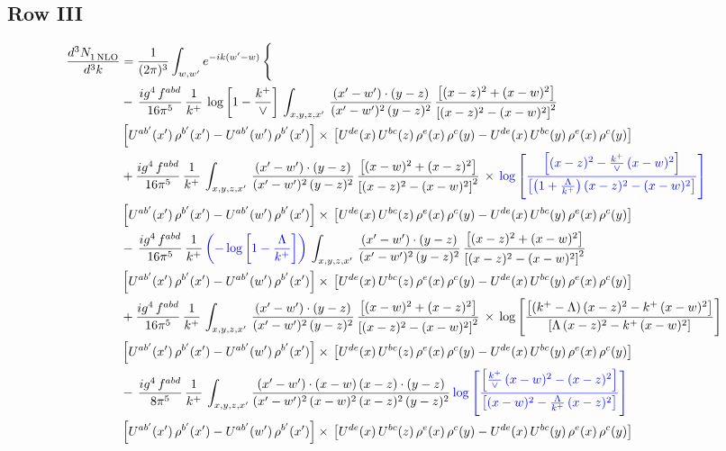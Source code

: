 \documentclass[9pt]{article}
\newcommand{\new}[1]{{\color{blue}#1}}
\numberwithin{equation}{section}
\begin{document}
\subsection{Row III}
\begin{align}
   \frac{d^{3}N_{1\,\rm NLO}^{\rm}}{d^{3}k}  & = \frac{1}{(2\pi)^{3}}  \int_{w, w^\prime} e^{-ik(w^\prime-w)}\, \Bigg\{\notag \\ & -\,\frac{ig^{4}\,f^{abd}}{16\pi^{5}}\,\frac{1}{k^{+}}\, \log{\left[1-\frac{k^{+}}{\vee}\right]}\,\int_{x,y,z,x'}\, \frac{(x'-w')\cdot (y-z)}{(x'-w')^{2}\,(y-z)^{2}}\,\frac{\left[(x-z)^{2}+(x-w)^{2}\right]}{\left[(x-z)^{2}-(x-w)^{2}\right]^{2}}\notag \\ & \left[U^{ab'}(x')\,\rho^{b'}(x')-U^{ab'}(w')\, \rho^{b'}(x')\right]\times\, \left[U^{de}(x)\,U^{bc}(z)\, \rho^{e}(x)\,\rho^{c}(y)-U^{de}(x)\,U^{bc}(y)\,\rho^{e}(x)\,\rho^{c}(y)\right]\notag \\ &  +\frac{ig^{4}\,f^{abd}}{16\pi^{5}}\, \frac{1}{k^{+}}\,\int_{x,y,z,x'}\, \frac{(x'-w')\cdot (y-z)}{(x'-w')^{2}\,(y-z)^{2}}\, \frac{\left[(x-w)^{2}+(x-z)^{2}\right]}{\left[(x-z)^{2}-(x-w)^{2}\right]^{2}}\, \times\, \new{\log{\left[\frac{\left[(x-z)^{2} - \frac{k^{+}}{\vee}\, (x-w)^{2}\right]}{\left[\left(1+\frac{\Lambda}{k^{+}}\right) (x-z)^{2} - (x-w)^{2}\right]}\right]}}\notag \\ & \left[U^{ab'}(x')\,\rho^{b'}(x')-U^{ab'}(w')\, \rho^{b'}(x')\right]\times\, \left[U^{de}(x)\,U^{bc}(z)\, \rho^{e}(x)\,\rho^{c}(y)-U^{de}(x)\,U^{bc}(y)\,\rho^{e}(x)\,\rho^{c}(y)\right]\notag \\ &  -\,\frac{ig^{4}\,f^{abd}}{16\pi^{5}}\,\frac{1}{k^{+}}\,\new{\left(-\log{\left[1-\frac{\Lambda}{k^{+}}\right]}\right)} \,\int_{x,y,z,x'}\, \frac{(x'-w')\cdot (y-z)}{(x'-w')^{2}\,(y-z)^{2}}\,\frac{\left[(x-z)^{2}+(x-w)^{2}\right]}{\left[(x-z)^{2}-(x-w)^{2}\right]^{2}}\notag \\ & \left[U^{ab'}(x')\,\rho^{b'}(x')-U^{ab'}(w')\, \rho^{b'}(x')\right]\times\, \left[U^{de}(x)\,U^{bc}(z)\, \rho^{e}(x)\,\rho^{c}(y)-U^{de}(x)\,U^{bc}(y)\,\rho^{e}(x)\,\rho^{c}(y)\right]\notag \\ & +\frac{ig^{4}\,f^{abd}}{16\pi^{5}}\, \frac{1}{k^{+}}\,\int_{x,y,z,x'}\, \frac{(x'-w')\cdot (y-z)}{(x'-w')^{2}\,(y-z)^{2}}\, \frac{\left[(x-w)^{2}+(x-z)^{2}\right]}{\left[(x-z)^{2}-(x-w)^{2}\right]^{2}}\, \times\, \log{\left[\frac{\left[(k^{+}-\Lambda)\, (x-z)^{2} - k^{+}\, (x-w)^{2}\right]}{\left[\Lambda\, (x-z)^{2} - k^{+}\, (x-w)^{2}\right]}\right]}\notag \\ & \left[U^{ab'}(x')\,\rho^{b'}(x')-U^{ab'}(w')\, \rho^{b'}(x')\right]\times\, \left[U^{de}(x)\,U^{bc}(z)\, \rho^{e}(x)\,\rho^{c}(y)-U^{de}(x)\,U^{bc}(y)\,\rho^{e}(x)\,\rho^{c}(y)\right]\notag \\ & -\, \frac{ig^{4}\,f^{abd}}{8\pi^{5}}\,\frac{1}{k^{+}}\,\int_{x,y,z,x'}\frac{(x'-w')\cdot (x-w)\, (x-z)\cdot (y-z)}{(x'-w')^{2}\, (x-w)^{2}\, (x-z)^{2}\, (y-z)^{2}}\,\new{\log{\left[\frac{\left[\frac{k^{+}}{\vee}\,(x-w)^{2}-(x-z)^{2}\right]}{\left[(x-w)^{2}-\frac{\Lambda}{k^{+}}\, (x-z)^{2}\right]}\right]}} \notag \\ & \left[U^{ab'}(x')\,\rho^{b'}(x')-U^{ab'}(w')\, \rho^{b'}(x')\right]\times\, \left[U^{de}(x)\,U^{bc}(z)\, \rho^{e}(x)\,\rho^{c}(y)-U^{de}(x)\,U^{bc}(y)\,\rho^{e}(x)\,\rho^{c}(y)\right]
\end{align}
\end{document}
